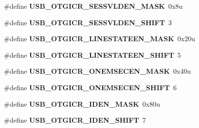 \begin{DoxyCompactItemize}
\item 
\#define {\bfseries U\+S\+B\+\_\+\+O\+T\+G\+I\+C\+R\+\_\+\+S\+E\+S\+S\+V\+L\+D\+E\+N\+\_\+\+M\+A\+SK}~0x8u\hypertarget{group__USB__Register__Masks_ga35e32e6ed718719eb90a5aa7b8af10f3}{}\label{group__USB__Register__Masks_ga35e32e6ed718719eb90a5aa7b8af10f3}

\item 
\#define {\bfseries U\+S\+B\+\_\+\+O\+T\+G\+I\+C\+R\+\_\+\+S\+E\+S\+S\+V\+L\+D\+E\+N\+\_\+\+S\+H\+I\+FT}~3\hypertarget{group__USB__Register__Masks_ga6f1a0dd83404b56be4be006b113f68d8}{}\label{group__USB__Register__Masks_ga6f1a0dd83404b56be4be006b113f68d8}

\item 
\#define {\bfseries U\+S\+B\+\_\+\+O\+T\+G\+I\+C\+R\+\_\+\+L\+I\+N\+E\+S\+T\+A\+T\+E\+E\+N\+\_\+\+M\+A\+SK}~0x20u\hypertarget{group__USB__Register__Masks_gac9d12e9bdf0d60b52ea0b99c668630af}{}\label{group__USB__Register__Masks_gac9d12e9bdf0d60b52ea0b99c668630af}

\item 
\#define {\bfseries U\+S\+B\+\_\+\+O\+T\+G\+I\+C\+R\+\_\+\+L\+I\+N\+E\+S\+T\+A\+T\+E\+E\+N\+\_\+\+S\+H\+I\+FT}~5\hypertarget{group__USB__Register__Masks_ga1824eae0010a884c2b3bd425cfa2b389}{}\label{group__USB__Register__Masks_ga1824eae0010a884c2b3bd425cfa2b389}

\item 
\#define {\bfseries U\+S\+B\+\_\+\+O\+T\+G\+I\+C\+R\+\_\+\+O\+N\+E\+M\+S\+E\+C\+E\+N\+\_\+\+M\+A\+SK}~0x40u\hypertarget{group__USB__Register__Masks_gac68531fd32d53520e1d1ccdd4cfae9ec}{}\label{group__USB__Register__Masks_gac68531fd32d53520e1d1ccdd4cfae9ec}

\item 
\#define {\bfseries U\+S\+B\+\_\+\+O\+T\+G\+I\+C\+R\+\_\+\+O\+N\+E\+M\+S\+E\+C\+E\+N\+\_\+\+S\+H\+I\+FT}~6\hypertarget{group__USB__Register__Masks_ga29ccacd7b79d6d2df3b8743ccd1c467f}{}\label{group__USB__Register__Masks_ga29ccacd7b79d6d2df3b8743ccd1c467f}

\item 
\#define {\bfseries U\+S\+B\+\_\+\+O\+T\+G\+I\+C\+R\+\_\+\+I\+D\+E\+N\+\_\+\+M\+A\+SK}~0x80u\hypertarget{group__USB__Register__Masks_gaa13997b88383cb1aec6f042ecdb94399}{}\label{group__USB__Register__Masks_gaa13997b88383cb1aec6f042ecdb94399}

\item 
\#define {\bfseries U\+S\+B\+\_\+\+O\+T\+G\+I\+C\+R\+\_\+\+I\+D\+E\+N\+\_\+\+S\+H\+I\+FT}~7\hypertarget{group__USB__Register__Masks_ga36d7ef200033a393e023ab06808f7129}{}\label{group__USB__Register__Masks_ga36d7ef200033a393e023ab06808f7129}


\end{DoxyCompactItemize}
